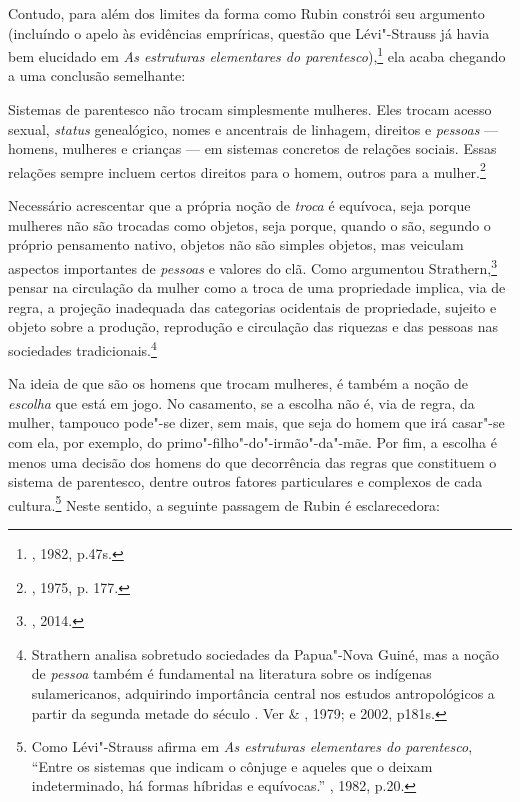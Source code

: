 Contudo, para além dos limites da forma como Rubin constrói seu
argumento (incluíndo o apelo às evidências empríricas, questão que
Lévi"-Strauss já havia bem elucidado em \emph{As estruturas elementares
do parentesco}),\footnote{, 1982, p.47s.} ela acaba chegando
a uma conclusão semelhante:

Sistemas de parentesco não trocam simplesmente mulheres. Eles trocam
acesso sexual, \emph{status} genealógico, nomes e ancentrais de
linhagem, direitos e \emph{pessoas} --- homens, mulheres e crianças ---
em sistemas concretos de relações sociais. Essas relações sempre incluem
certos direitos para o homem, outros para a mulher.\footnote{,
  1975, p. 177.}

Necessário acrescentar que a própria noção de \emph{troca} é equívoca,
seja porque mulheres não são trocadas como objetos, seja porque, quando
o são, segundo o próprio pensamento nativo, objetos não são simples
objetos, mas veiculam aspectos importantes de \emph{pessoas} e valores
do clã. Como argumentou Strathern,\footnote{, 2014.} pensar na
circulação da mulher como a troca de uma propriedade implica, via de
regra, a projeção inadequada das categorias ocidentais de propriedade,
sujeito e objeto sobre a produção, reprodução e circulação das riquezas
e das pessoas nas sociedades tradicionais.\footnote{Strathern analisa
  sobretudo sociedades da Papua"-Nova Guiné, mas a noção de \emph{pessoa}
  também é fundamental na literatura sobre os indígenas sulamericanos,
  adquirindo importância central nos estudos antropológicos a partir da
  segunda metade do século . Ver  \& , 1979; e  2002, p181s.}

Na ideia de que são os homens que trocam mulheres, é também a noção de
\emph{escolha} que está em jogo. No casamento, se a escolha não é, via
de regra, da mulher, tampouco pode"-se dizer, sem mais, que seja do homem
que irá casar"-se com ela, por exemplo, do primo"-filho"-do"-irmão"-da"-mãe.
Por fim, a escolha é menos uma decisão dos homens do que decorrência das
regras que constituem o sistema de parentesco, dentre outros fatores
particulares e complexos de cada cultura.\footnote{Como Lévi"-Strauss
  afirma em \emph{As estruturas elementares do parentesco}, ``Entre os
  sistemas que indicam o cônjuge e aqueles que o deixam
  indeterminado, há formas híbridas e equívocas.'' , 1982,
  p.20.} Neste sentido, a seguinte passagem de Rubin é esclarecedora:

